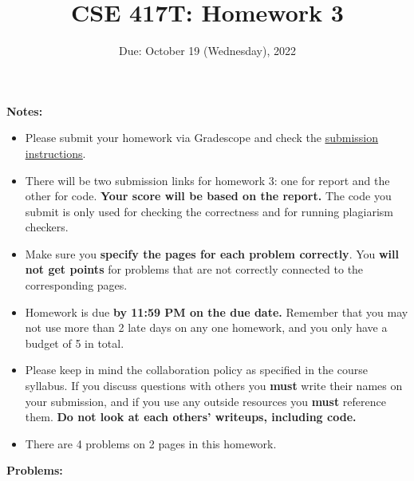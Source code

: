 \documentclass[11pt]{article}
\begin{document}
\title{CSE 417T: Homework 3}
\date{Due: October 19 (Wednesday), 2022}

\vspace{-20pt}
\maketitle

\noindent \textbf{Notes: } 
\begin{itemize}

\item Please submit your homework via Gradescope and check the \href{http://chienjuho.com/courses/cse417t/hw_instructions.html}{\underline{submission instructions}}.

\vspace{-5pt}
\item There will be two submission links for homework 3: one for report and the other for code. \textbf{Your score will be based on the report.} The code you submit is only used for checking the correctness and for running plagiarism checkers.

\vspace{-5pt}
\item Make sure you \textbf{specify the pages for each problem correctly}. You \textbf{will not get points} for problems that are not correctly connected to the corresponding pages.

\vspace{-5pt}
\item Homework is due \textbf{by 11:59 PM on the due date.} Remember that
  you may not use more than 2 late days on any one homework, and you
  only have a budget of 5 in total.

\vspace{-5pt}
\item Please keep in mind the collaboration policy as specified in the
  course syllabus. If you discuss questions with 
others you \textbf{must} write their names on your submission, and if
you use any outside resources you \textbf{must} reference
them. \textbf{Do not look at each others' writeups, including code.}

\vspace{-5pt}
\item There are 4 problems on 2 pages in this homework. 

\end{itemize}

\noindent \textbf{Problems:}
\end{document}
